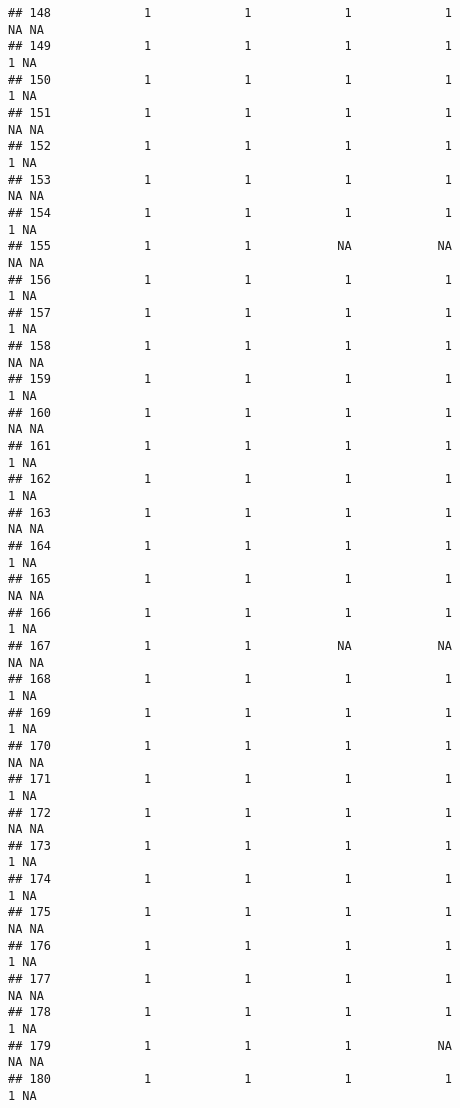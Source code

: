 \documentclass[
]{article}
\begin{document}
\begin{verbatim}
## 148             1             1             1             1            NA NA
## 149             1             1             1             1             1 NA
## 150             1             1             1             1             1 NA
## 151             1             1             1             1            NA NA
## 152             1             1             1             1             1 NA
## 153             1             1             1             1            NA NA
## 154             1             1             1             1             1 NA
## 155             1             1            NA            NA            NA NA
## 156             1             1             1             1             1 NA
## 157             1             1             1             1             1 NA
## 158             1             1             1             1            NA NA
## 159             1             1             1             1             1 NA
## 160             1             1             1             1            NA NA
## 161             1             1             1             1             1 NA
## 162             1             1             1             1             1 NA
## 163             1             1             1             1            NA NA
## 164             1             1             1             1             1 NA
## 165             1             1             1             1            NA NA
## 166             1             1             1             1             1 NA
## 167             1             1            NA            NA            NA NA
## 168             1             1             1             1             1 NA
## 169             1             1             1             1             1 NA
## 170             1             1             1             1            NA NA
## 171             1             1             1             1             1 NA
## 172             1             1             1             1            NA NA
## 173             1             1             1             1             1 NA
## 174             1             1             1             1             1 NA
## 175             1             1             1             1            NA NA
## 176             1             1             1             1             1 NA
## 177             1             1             1             1            NA NA
## 178             1             1             1             1             1 NA
## 179             1             1             1            NA            NA NA
## 180             1             1             1             1             1 NA

\end{verbatim}
\end{document}
